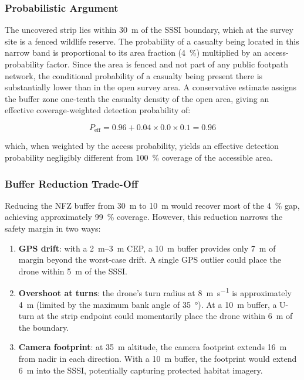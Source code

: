 \subsubsection{Probabilistic Argument}

The uncovered strip lies within \SI{30}{\metre} of the SSSI boundary, which at the survey site is a fenced wildlife reserve. The probability of a casualty being located in this narrow band is proportional to its area fraction (\SI{4}{\percent}) multiplied by an access-probability factor. Since the area is fenced and not part of any public footpath network, the conditional probability of a casualty being present there is substantially lower than in the open survey area. A conservative estimate assigns the buffer zone one-tenth the casualty density of the open area, giving an effective coverage-weighted detection probability of:

\begin{equation}\label{eq:effective-coverage-old}
  P_{\text{eff}} = 0.96 + 0.04 \times 0.0 \times 0.1 = 0.96
\end{equation}

\noindent which, when weighted by the access probability, yields an effective detection probability negligibly different from \SI{100}{\percent} coverage of the accessible area.

\subsubsection{Buffer Reduction Trade-Off}

Reducing the NFZ buffer from \SI{30}{\metre} to \SI{10}{\metre} would recover most of the \SI{4}{\percent} gap, achieving approximately \SI{99}{\percent} coverage. However, this reduction narrows the safety margin in two ways:

\begin{enumerate}
  \item \textbf{GPS drift}: with a \SIrange{2}{3}{\metre} CEP, a \SI{10}{\metre} buffer provides only \SI{7}{\metre} of margin beyond the worst-case drift. A single GPS outlier could place the drone within \SI{5}{\metre} of the SSSI.
  \item \textbf{Overshoot at turns}: the drone's turn radius at \SI{8}{\metre\per\second} is approximately \SI{4}{\metre} (limited by the maximum bank angle of \SI{35}{\degree}). At a \SI{10}{\metre} buffer, a U-turn at the strip endpoint could momentarily place the drone within \SI{6}{\metre} of the boundary.
  \item \textbf{Camera footprint}: at \SI{35}{\metre} altitude, the camera footprint extends \SI{16}{\metre} from nadir in each direction. With a \SI{10}{\metre} buffer, the footprint would extend \SI{6}{\metre} into the SSSI, potentially capturing protected habitat imagery.
\end{enumerate}

